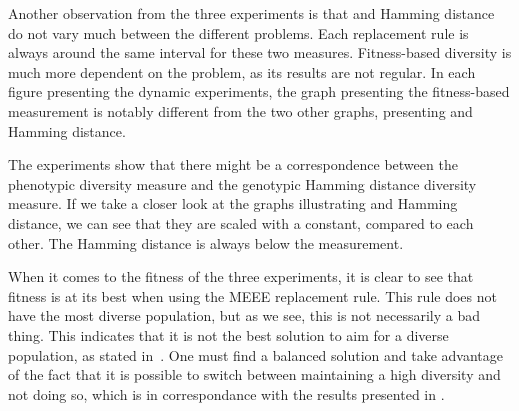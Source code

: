 Another observation from the three experiments is that \dia{} and Hamming distance do not vary much between the different problems. Each replacement rule is always around the same interval for these two measures. Fitness-based diversity is much more dependent on the problem, as its results are not regular. In each figure presenting the dynamic experiments, the graph presenting the fitness-based measurement is notably different from the two other graphs, presenting \dia{} and Hamming distance.

The experiments show that there might be a correspondence between the phenotypic \dia{} diversity measure and the genotypic Hamming distance diversity measure. If we take a closer look at the graphs illustrating \dia{} and Hamming distance, we can see that they are scaled with a constant, compared to each other. The Hamming distance is always below the \dia{} measurement.%

When it comes to the fitness of the three experiments, it is clear to see that fitness is at its best when using the MEEE replacement rule. This rule does not have the most diverse population, but as we see, this is not necessarily a bad thing. This indicates that it is not the best solution to aim for a  diverse population, as stated in~\cite{Darwen00doesextra}. One must find a balanced solution and take advantage of the fact that it is possible to switch between maintaining a high diversity and not doing so, which is in correspondance with the results presented in \cite{Darwen00doesextra}.
